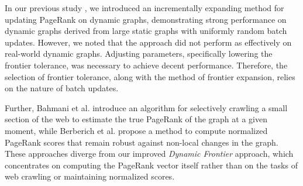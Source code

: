 In our previous study \cite{sahu2024incrementally}, we introduced an incrementally expanding method for updating PageRank on dynamic graphs, demonstrating strong performance on dynamic graphs derived from large static graphs with uniformly random batch updates. However, we noted that the approach did not perform as effectively on real-world dynamic graphs. Adjusting parameters, specifically lowering the frontier tolerance, was necessary to achieve decent performance. Therefore, the selection of frontier tolerance, along with the method of frontier expansion, relies on the nature of batch updates.

Further, Bahmani et al. \cite{rank-bahmani12} introduce an algorithm for selectively crawling a small section of the web to estimate the true PageRank of the graph at a given moment, while Berberich et al. \cite{rank-berberich07} propose a method to compute normalized PageRank scores that remain robust against non-local changes in the graph. These approaches diverge from our improved \textit{Dynamic Frontier} approach, which concentrates on computing the PageRank vector itself rather than on the tasks of web crawling or maintaining normalized scores.





